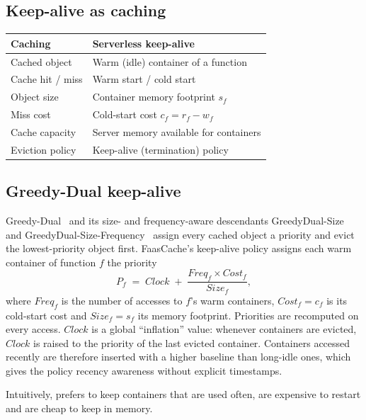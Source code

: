 \documentclass[11pt,a4paper]{article}
\newcommand{\gd}{\text{GD}}
\begin{document}
\subsection{Keep-alive as caching}
\begin{center}
\begin{tabular}{@{}ll@{}}
\toprule
\textbf{Caching} & \textbf{Serverless keep-alive} \\
\midrule
Cached object        & Warm (idle) container of a function \\
Cache hit / miss     & Warm start / cold start \\
Object size          & Container memory footprint $s_f$ \\
Miss cost            & Cold-start cost $c_f = r_f - w_f$ \\
Cache capacity       & Server memory available for containers \\
Eviction policy      & Keep-alive (termination) policy \\
\bottomrule
\end{tabular}
\end{center}

\subsection{Greedy-Dual keep-alive}
Greedy-Dual~\cite{young1994kserver} and its size- and frequency-aware descendants
GreedyDual-Size~\cite{cao1997gds} and GreedyDual-Size-Frequency~\cite{cherkasova1998gdsf}
assign every cached object a priority and evict the lowest-priority object first. FaasCache's
\gd{} keep-alive policy assigns each warm container of function $f$ the priority
\begin{equation}
  \label{eq:gd}
  P_f \;=\; \mathit{Clock} \;+\; \frac{\mathit{Freq}_f \times \mathit{Cost}_f}{\mathit{Size}_f},
\end{equation}
where $\mathit{Freq}_f$ is the number of accesses to $f$'s warm containers, $\mathit{Cost}_f = c_f$
is its cold-start cost and $\mathit{Size}_f = s_f$ its memory footprint. Priorities are
recomputed on every access. $\mathit{Clock}$ is a global ``inflation'' value: whenever
containers are evicted, $\mathit{Clock}$ is raised to the priority of the last evicted
container. Containers accessed recently are therefore inserted with a higher baseline than
long-idle ones, which gives the policy recency awareness without explicit timestamps.

Intuitively, \gd{} prefers to keep containers that are used often, are expensive to
restart and are cheap to keep in memory.
\end{document}
